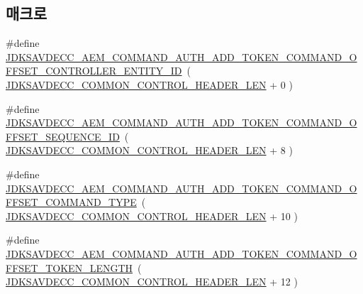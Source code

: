 \subsection*{매크로}
\begin{DoxyCompactItemize}
\item 
\#define \hyperlink{group__command__auth__add__token_gaee3b9ca9389a138bf3ec167c06e49c0e}{J\+D\+K\+S\+A\+V\+D\+E\+C\+C\+\_\+\+A\+E\+M\+\_\+\+C\+O\+M\+M\+A\+N\+D\+\_\+\+A\+U\+T\+H\+\_\+\+A\+D\+D\+\_\+\+T\+O\+K\+E\+N\+\_\+\+C\+O\+M\+M\+A\+N\+D\+\_\+\+O\+F\+F\+S\+E\+T\+\_\+\+C\+O\+N\+T\+R\+O\+L\+L\+E\+R\+\_\+\+E\+N\+T\+I\+T\+Y\+\_\+\+ID}~( \hyperlink{group__jdksavdecc__avtp__common__control__header_gaae84052886fb1bb42f3bc5f85b741dff}{J\+D\+K\+S\+A\+V\+D\+E\+C\+C\+\_\+\+C\+O\+M\+M\+O\+N\+\_\+\+C\+O\+N\+T\+R\+O\+L\+\_\+\+H\+E\+A\+D\+E\+R\+\_\+\+L\+EN} + 0 )
\item 
\#define \hyperlink{group__command__auth__add__token_gae0c52d843ecf062684fa0ac1195144db}{J\+D\+K\+S\+A\+V\+D\+E\+C\+C\+\_\+\+A\+E\+M\+\_\+\+C\+O\+M\+M\+A\+N\+D\+\_\+\+A\+U\+T\+H\+\_\+\+A\+D\+D\+\_\+\+T\+O\+K\+E\+N\+\_\+\+C\+O\+M\+M\+A\+N\+D\+\_\+\+O\+F\+F\+S\+E\+T\+\_\+\+S\+E\+Q\+U\+E\+N\+C\+E\+\_\+\+ID}~( \hyperlink{group__jdksavdecc__avtp__common__control__header_gaae84052886fb1bb42f3bc5f85b741dff}{J\+D\+K\+S\+A\+V\+D\+E\+C\+C\+\_\+\+C\+O\+M\+M\+O\+N\+\_\+\+C\+O\+N\+T\+R\+O\+L\+\_\+\+H\+E\+A\+D\+E\+R\+\_\+\+L\+EN} + 8 )
\item 
\#define \hyperlink{group__command__auth__add__token_ga1cdfb96149641009a5173497d954d29d}{J\+D\+K\+S\+A\+V\+D\+E\+C\+C\+\_\+\+A\+E\+M\+\_\+\+C\+O\+M\+M\+A\+N\+D\+\_\+\+A\+U\+T\+H\+\_\+\+A\+D\+D\+\_\+\+T\+O\+K\+E\+N\+\_\+\+C\+O\+M\+M\+A\+N\+D\+\_\+\+O\+F\+F\+S\+E\+T\+\_\+\+C\+O\+M\+M\+A\+N\+D\+\_\+\+T\+Y\+PE}~( \hyperlink{group__jdksavdecc__avtp__common__control__header_gaae84052886fb1bb42f3bc5f85b741dff}{J\+D\+K\+S\+A\+V\+D\+E\+C\+C\+\_\+\+C\+O\+M\+M\+O\+N\+\_\+\+C\+O\+N\+T\+R\+O\+L\+\_\+\+H\+E\+A\+D\+E\+R\+\_\+\+L\+EN} + 10 )
\item 
\#define \hyperlink{group__command__auth__add__token_ga29cf4cd9567a8b8045ffd9e0a2958877}{J\+D\+K\+S\+A\+V\+D\+E\+C\+C\+\_\+\+A\+E\+M\+\_\+\+C\+O\+M\+M\+A\+N\+D\+\_\+\+A\+U\+T\+H\+\_\+\+A\+D\+D\+\_\+\+T\+O\+K\+E\+N\+\_\+\+C\+O\+M\+M\+A\+N\+D\+\_\+\+O\+F\+F\+S\+E\+T\+\_\+\+T\+O\+K\+E\+N\+\_\+\+L\+E\+N\+G\+TH}~( \hyperlink{group__jdksavdecc__avtp__common__control__header_gaae84052886fb1bb42f3bc5f85b741dff}{J\+D\+K\+S\+A\+V\+D\+E\+C\+C\+\_\+\+C\+O\+M\+M\+O\+N\+\_\+\+C\+O\+N\+T\+R\+O\+L\+\_\+\+H\+E\+A\+D\+E\+R\+\_\+\+L\+EN} + 12 )
\item 

\end{DoxyCompactItemize}
